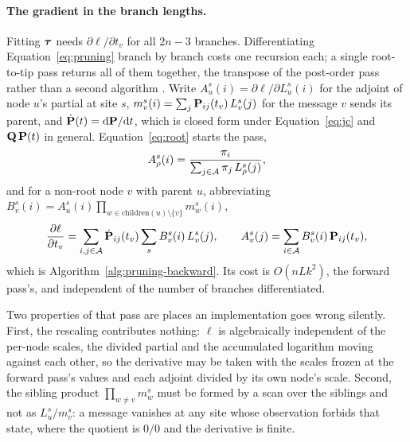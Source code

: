 \documentclass[11pt,a4paper]{article}
\begin{document}
\paragraph{The gradient in the branch lengths.}
Fitting $\boldsymbol{\tau}$ needs $\partial \ell / \partial t_v$ for all $2n-3$ branches.
Differentiating Equation~\ref{eq:pruning} branch by branch costs one recursion
each; a single root-to-tip pass returns all of them together, the transpose of
the post-order pass rather than a second algorithm \citep{felsenstein2004}.
Write $A^s_u(i) = \partial \ell / \partial L^s_u(i)$
for the adjoint of node $u$'s partial at site $s$, $m^s_v(i) = \sum_j
\mathbf{P}_{ij}(t_v)\, L^s_v(j)$ for the message $v$ sends its parent, and
$\dot{\mathbf{P}}(t) = \mathrm{d}\mathbf{P}/\mathrm{d}t$, which is closed form under
Equation~\ref{eq:jc} and $\mathbf{Q}\,\mathbf{P}(t)$ in general. Equation~\ref{eq:root}
starts the pass,
\begin{equation}
  A^s_{\rho}(i) = \frac{\pi_i}{\sum_{j \in \mathcal{A}} \pi_j\, L^s_{\rho}(j)},
  \label{eq:adjoint-root}
\end{equation}
and for a non-root node $v$ with parent $u$, abbreviating
$B^s_v(i) = A^s_u(i) \prod_{w \in \mathrm{children}(u) \setminus \{v\}} m^s_w(i)$,
\begin{equation}
  \frac{\partial \ell}{\partial t_v}
    = \sum_{i,j \in \mathcal{A}} \dot{\mathbf{P}}_{ij}(t_v) \sum_s B^s_v(i)\, L^s_v(j),
  \qquad
  A^s_v(j) = \sum_{i \in \mathcal{A}} B^s_v(i)\, \mathbf{P}_{ij}(t_v),
  \label{eq:pruning-backward}
\end{equation}
which is Algorithm~\ref{alg:pruning-backward}. Its cost is $O(n L k^2)$, the
forward pass's, and independent of the number of branches differentiated.

Two properties of that pass are places an implementation goes wrong silently.
First, the rescaling contributes nothing: $\ell$ is algebraically independent
of the per-node scales, the divided partial and the accumulated logarithm
moving against each other, so the derivative may be taken with the scales
frozen at the forward pass's values and each adjoint divided by its own node's
scale. Second, the sibling product $\prod_{w \neq v} m^s_w$ must be formed by a
scan over the siblings and not as $L^s_u / m^s_v$: a message vanishes at any
site whose observation forbids that state, where the quotient is $0/0$ and the
derivative is finite.
\end{document}
